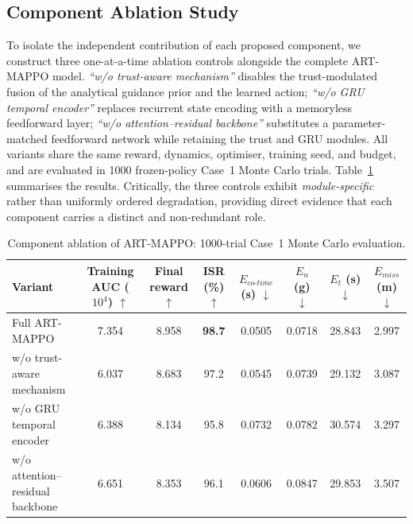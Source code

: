 \documentclass[lettersize,journal]{IEEEtran}
\newcommand{\hladd}[1]{{\color{blue}#1}}
\begin{document}

\subsection{\hladd{Component Ablation Study}}
\label{subsec:ablation}

\hladd{To isolate the independent contribution of each proposed component, we construct three
one-at-a-time ablation controls alongside the complete ART-MAPPO model.
\emph{``w/o trust-aware mechanism''} disables the trust-modulated fusion of the analytical
guidance prior and the learned action; \emph{``w/o GRU temporal encoder''} replaces recurrent
state encoding with a memoryless feedforward layer; \emph{``w/o attention--residual backbone''}
substitutes a parameter-matched feedforward network while retaining the trust and GRU modules.
All variants share the same reward, dynamics, optimiser, training seed, and budget, and are
evaluated in 1000 frozen-policy Case~1 Monte Carlo trials.  Table~\ref{tab:ablation_case1}
summarises the results.  Critically, the three controls exhibit \emph{module-specific} rather
than uniformly ordered degradation, providing direct evidence that each component carries a
distinct and non-redundant role.}

\begin{table}[!t]
\centering
\color{blue}
\small
\caption{Component ablation of ART-MAPPO: 1000-trial Case~1 Monte Carlo evaluation.}
\label{tab:ablation_case1}
\renewcommand{\arraystretch}{1.12}
\setlength{\tabcolsep}{3.5pt}
\begin{tabular}{lccccccc}
\toprule
Variant
  & Training AUC ($10^4$) $\uparrow$
  & Final reward $\uparrow$
  & ISR (\%) $\uparrow$
  & $E_{co\text{-}time}$ (s) $\downarrow$
  & $E_n$ (g) $\downarrow$
  & $E_t$ (s) $\downarrow$
  & $E_{miss}$ (m) $\downarrow$ \\
\midrule
Full ART-MAPPO                   & 7.354 & 8.958 & \textbf{98.7} & 0.0505 & 0.0718 & 28.843 & 2.997 \\
w/o trust-aware mechanism        & 6.037 & 8.683 & 97.2          & 0.0545 & 0.0739 & 29.132 & 3.087 \\
w/o GRU temporal encoder         & 6.388 & 8.134 & 95.8          & 0.0732 & 0.0782 & 30.574 & 3.297 \\
w/o attention--residual backbone & 6.651 & 8.353 & 96.1          & 0.0606 & 0.0847 & 29.853 & 3.507 \\
\bottomrule
\end{tabular}
\end{table}
\end{document}
